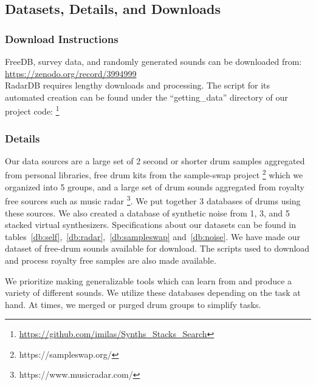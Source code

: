 \documentclass[runningheads,a4paper]{llncs}
\begin{document}
\begin{appendices}
\chapter{Datasets, Details, and Downloads}
\label{appendix:datasets}
\subsection{Download Instructions}
FreeDB, survey data, and randomly generated sounds can be downloaded from: \url{https://zenodo.org/record/3994999}\\
RadarDB requires lengthy downloads and processing. The script for its automated creation can be found under the \enquote{getting\_data} directory of our project code: \footnote{\url{https://github.com/imilas/Synths_Stacks_Search}}
\subsection{Details}
Our data sources are a large set of 2 second or shorter drum samples aggregated from personal libraries, free drum kits from the sample-swap project \footnote{https://sampleswap.org/} which we organized into 5 groups, and a large set of drum sounds aggregated from royalty free sources such as music radar \footnote{https://www.musicradar.com/}. We put together 3 databases of drums using these sources. We also created a database of synthetic noise from 1, 3, and 5 stacked virtual synthesizers. Specifications about our datasets can be found in tables~\ref{db:self},~\ref{db:radar},~\ref{db:sampleswap} and~\ref{db:noise}. We have made our dataset of free-drum sounds available for download. The scripts used to download and process royalty free samples are also made available. 

We prioritize making generalizable tools which can learn from and produce a variety of different sounds. We utilize these databases depending on the task at hand. At times, we merged or purged drum groups to simplify tasks.


\end{appendices}
\end{document}
